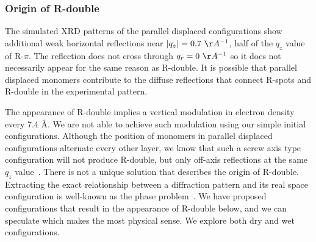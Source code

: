 \documentclass[journal=jpcbfk,manuscript=article]{achemso}
\begin{document}
  \subsubsection{Origin of R-double}\label{section:rdouble}
  
  The simulated XRD patterns of the parallel displaced configurations show additional
  weak horizontal reflections near $|q_z|= 0.7~\AA^{-1}$, half of the $q_z$ value of R-$\pi$.
  The reflection does not cross through $q_r = 0~\AA^{-1}$ so it does not necessarily appear
  for the same reason as R-double. It is possible that parallel displaced monomers contribute
  to the diffuse reflections that connect R-spots and R-double in the experimental pattern.
  
  
  The appearance of R-double implies a vertical modulation in electron density every 7.4 \AA.
  We are not able to achieve such modulation using our simple initial configurations. Although
  the position of monomers in parallel displaced configurations alternate every other layer, 
  we know that such a screw axis type configuration will not produce R-double, but only off-axis 
  reflections at the same $q_z$ value~\cite{harburn_atlas_1975}. There is not a unique solution
  that describes the origin of R-double. Extracting the exact relationship between a diffraction
  pattern and its real space configuration is well-known as the phase problem~\cite{taylor_phase_2003}.    
  We have proposed configurations that result in the appearance of R-double below, and we can 
  speculate which makes the most physical sense. We explore both dry and wet configurations.
 
\end{document}
